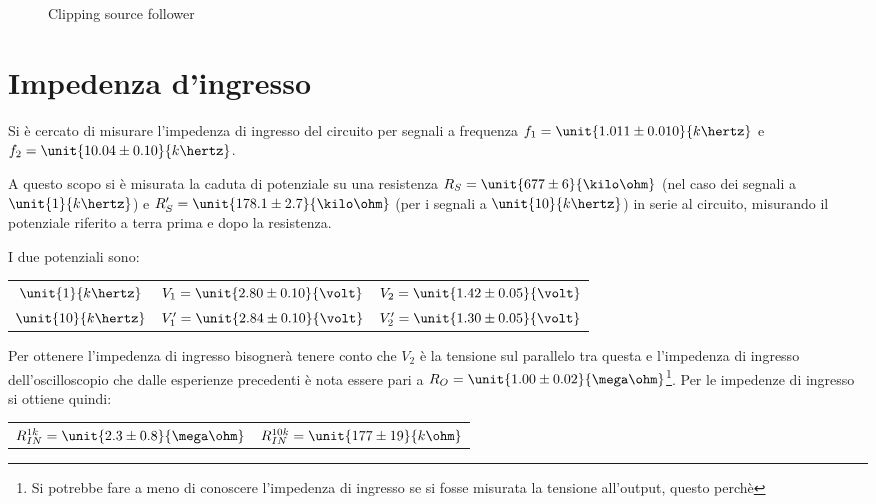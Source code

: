 \documentclass[10pt,a4paper]{article}
\begin{document}
\begin{figure}[h!]
\begin{minipage}{0.49\textwidth}
		\caption{Clipping source follower}	
			\label{fig:clippingbasso}	
	\end{minipage}
\end{figure}

\section{Impedenza d'ingresso}                                                                                                                                 
Si è cercato di misurare l'impedenza di ingresso del circuito per segnali a frequenza
$f_1 = \unit{1.011 \pm 0.010}{k\hertz}$ e $f_2= \unit{10.04 \pm 0.10}{k\hertz}$.

A questo scopo si è misurata la caduta di potenziale su una resistenza $R_S = \unit{677 \pm 6}{\kilo\ohm}$ (nel caso dei segnali a $\unit{1}{k\hertz}$) e $R_S' = \unit{178.1 \pm 2.7}{\kilo\ohm}$ (per i segnali a $\unit{10}{k\hertz}$) in serie al circuito, misurando il potenziale riferito a terra prima e dopo la resistenza.

I due potenziali sono:
\begin{table}[h!]
	\centering
	\begin{tabular}{c|cc}
		$\unit{1}{k\hertz}$ & $V_1 = \unit{2.80 \pm 0.10}{\volt}$  & $V_2 = \unit{1.42 \pm 0.05}{\volt}$\\
		$\unit{10}{k\hertz}$ & $V'_1 = \unit{2.84 \pm 0.10}{\volt}$  & $V'_2 = \unit{1.30 \pm 0.05}{\volt}$
	\end{tabular}
\end{table}

Per ottenere l'impedenza di ingresso bisognerà tenere conto che $V_2$ è la tensione sul parallelo tra questa e l'impedenza di ingresso dell'oscilloscopio che dalle esperienze precedenti è nota essere pari a $R_O=\unit{1.00 \pm 0.02}{\mega\ohm}$\footnote{Si potrebbe fare a meno di conoscere l'impedenza di ingresso se si fosse misurata la tensione all'output, questo perchè }. Per le impedenze di ingresso si ottiene quindi:
\begin{table}[h!]
	\centering
	\begin{tabular}{cc}
	$R_{IN}^{1k} = \unit{2.3 \pm 0.8}{\mega\ohm}$ & $R_{IN}^{10k} = \unit{177 \pm 19}{k\ohm}$
	\end{tabular}
\end{table}
\end{document}
